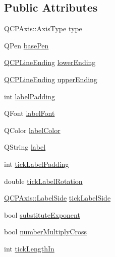 \subsection*{Public Attributes}
\begin{DoxyCompactItemize}
\item 
\hyperlink{class_q_c_p_axis_ae2bcc1728b382f10f064612b368bc18a}{Q\+C\+P\+Axis\+::\+Axis\+Type} \hyperlink{class_q_c_p_axis_painter_private_ae04594e97417336933d807c86d353098}{type}
\item 
Q\+Pen \hyperlink{class_q_c_p_axis_painter_private_ab4affb27ae3485fecb7466622cabcbb2}{base\+Pen}
\item 
\hyperlink{class_q_c_p_line_ending}{Q\+C\+P\+Line\+Ending} \hyperlink{class_q_c_p_axis_painter_private_a077696dd1e7efb96e4c199f521433e24}{lower\+Ending}
\item 
\hyperlink{class_q_c_p_line_ending}{Q\+C\+P\+Line\+Ending} \hyperlink{class_q_c_p_axis_painter_private_af764be913be5f924700ac9bbb8c01139}{upper\+Ending}
\item 
int \hyperlink{class_q_c_p_axis_painter_private_a3f7465372df132bf7814345ea697dd34}{label\+Padding}
\item 
Q\+Font \hyperlink{class_q_c_p_axis_painter_private_add1ff1030fbc36112c19b1468ad82d55}{label\+Font}
\item 
Q\+Color \hyperlink{class_q_c_p_axis_painter_private_a5c36467daf057da0cf0792f3c5a06089}{label\+Color}
\item 
Q\+String \hyperlink{class_q_c_p_axis_painter_private_afe004c322f92543c0467afc02da6cf6d}{label}
\item 
int \hyperlink{class_q_c_p_axis_painter_private_a264cfa080e84e536cf2d1ab9c5d5cc5f}{tick\+Label\+Padding}
\item 
double \hyperlink{class_q_c_p_axis_painter_private_ae6ade9232a8e400924009e8edca94bac}{tick\+Label\+Rotation}
\item 
\hyperlink{class_q_c_p_axis_a24b13374b9b8f75f47eed2ea78c37db9}{Q\+C\+P\+Axis\+::\+Label\+Side} \hyperlink{class_q_c_p_axis_painter_private_a9d27f7625fcfbeb3a60193d0c18fc7e9}{tick\+Label\+Side}
\item 
bool \hyperlink{class_q_c_p_axis_painter_private_a546d22b10ddb5ca8582b7deb90223a91}{substitute\+Exponent}
\item 
bool \hyperlink{class_q_c_p_axis_painter_private_a0deb7524009140f00a774dfd286d002c}{number\+Multiply\+Cross}
\item 
int \hyperlink{class_q_c_p_axis_painter_private_ae7360ff805fc6097019de8b35ffbd7e7}{tick\+Length\+In}

\end{DoxyCompactItemize}
